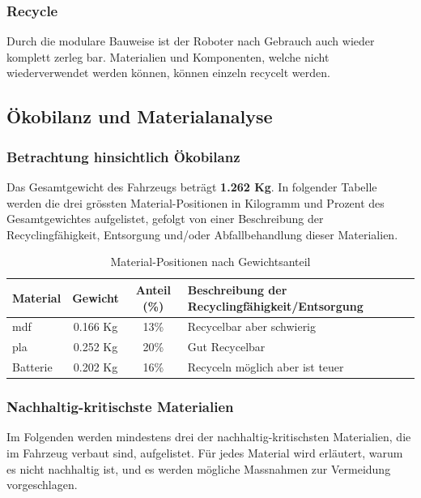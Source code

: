 \subsubsection{Recycle}

Durch die modulare Bauweise ist der Roboter nach Gebrauch auch wieder komplett zerleg
bar. Materialien und Komponenten, welche nicht wiederverwendet werden können, können einzeln recycelt werden.

\subsection{Ökobilanz und Materialanalyse}

\subsubsection{Betrachtung hinsichtlich Ökobilanz}
Das Gesamtgewicht des Fahrzeugs beträgt \textbf{1.262 Kg}. In folgender Tabelle werden die drei grössten Material-Positionen in Kilogramm und Prozent des Gesamtgewichtes aufgelistet, gefolgt von einer Beschreibung der Recyclingfähigkeit, Entsorgung und/oder Abfallbehandlung dieser Materialien.

\begin{table}[h]
\centering
\caption{Material-Positionen nach Gewichtsanteil}
\begin{tabular}{l c c p{5cm}}
\toprule
Material & Gewicht  & Anteil (\%) & Beschreibung der Recyclingfähigkeit/Entsorgung \\
\midrule
\acrshort{mdf} & 0.166 Kg & 13\% & Recycelbar aber schwierig \\
\acrshort{pla} & 0.252 Kg & 20\% & Gut Recycelbar \\
Batterie & 0.202 Kg & 16\% & Recyceln möglich aber ist teuer \\
\bottomrule
\end{tabular}
\end{table}

\subsubsection{Nachhaltig-kritischste Materialien}
Im Folgenden werden mindestens drei der nachhaltig-kritischsten Materialien, die im Fahrzeug verbaut sind, aufgelistet. Für jedes Material wird erläutert, warum es nicht nachhaltig ist, und es werden mögliche Massnahmen zur Vermeidung vorgeschlagen.

